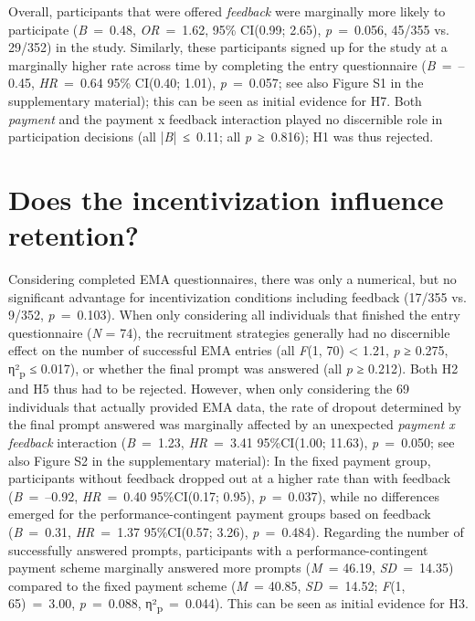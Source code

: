 \documentclass[authordate, empirical]{jote-new-article}
\begin{document}
	Overall, participants that were offered \emph{feedback} were marginally more likely to participate (\emph{B} = 0.48, \emph{OR} = 1.62, 95\% CI(0.99; 2.65), \emph{p} = 0.056, 45/355 vs. 29/352) in the study. Similarly, these participants signed up for the study at a marginally higher rate across time by completing the entry questionnaire (\emph{B} = --0.45, \emph{HR} = 0.64 95\% CI(0.40; 1.01), \emph{p} = 0.057; see also Figure S1 in the supplementary material); this can be seen as initial evidence for H7. Both \emph{payment} and the payment x feedback interaction played no discernible role in participation decisions (all |\emph{B}| ≤ 0.11; all \emph{p} ≥ 0.816); H1 was thus rejected.



	\section{\textbf{Does }\textbf{the incentivization}\textbf{ influence retention?}}



	Considering completed EMA questionnaires, there was only a numerical, but no significant advantage for incentivization conditions including feedback (17/355 vs. 9/352, \emph{p} = 0.103). When only considering all individuals that finished the entry questionnaire (\emph{N} = 74), the recruitment strategies generally had no discernible effect on the number of successful EMA entries (all \emph{F}(1, 70) < 1.21, \emph{p} ≥ 0.275, η²\textsubscript{p} ≤ 0.017), or whether the final prompt was answered (all \emph{p} ≥ 0.212). Both H2 and H5 thus had to be rejected. However, when only considering the 69 individuals that actually provided EMA data, the rate of dropout determined by the final prompt answered was marginally affected by an unexpected \emph{payment x feedback }interaction (\emph{B} = 1.23, \emph{HR} = 3.41 95\%CI(1.00; 11.63), \emph{p} = 0.050; see also Figure S2 in the supplementary material): In the fixed payment group, participants without feedback dropped out at a higher rate than with feedback (\emph{B }= --0.92, \emph{HR} = 0.40 95\%CI(0.17; 0.95), \emph{p} = 0.037), while no differences emerged for the performance-contingent payment groups based on feedback (\emph{B} = 0.31, \emph{HR} = 1.37 95\%CI(0.57; 3.26), \emph{p} = 0.484). Regarding the number of successfully answered prompts, participants with a performance-contingent payment scheme marginally answered more prompts (\emph{M }= 46.19, \emph{SD }= 14.35) compared to the fixed payment scheme (\emph{M }= 40.85, \emph{SD }= 14.52; \emph{F}(1, 65) = 3.00, \emph{p} = 0.088, η²\textsubscript{p} = 0.044). This can be seen as initial evidence for H3.
\end{document}
